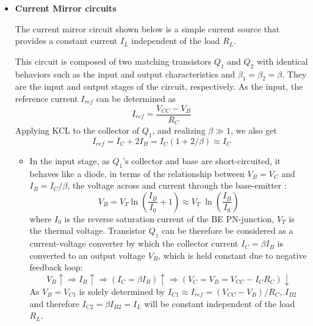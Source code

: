 \documentclass{article}
\begin{document}
\begin{itemize}


\item {\bf Current Mirror circuits}

  The current mirror circuit shown below is a simple current source
  that provides a constant current $I_L$ independent of the load $R_L$. 


  This circuit is composed of two matching transistors $Q_1$ and $Q_2$
  with identical behaviors such as the input and output characteristics
  and $\beta_1=\beta_2=\beta$. They are the input and output stages of
  the circuit, respectively. As the input, the reference current $I_{ref}$
  can be determined as
  \begin{equation}
    I_{ref}=\frac{V_{CC}-V_B}{R_C}
  \end{equation}
  Applying KCL to the collector of $Q_1$, and realizing $\beta\gg 1$,
  we also get
  \begin{equation}
    I_{ref}=I_C+2I_B=I_C(1+2/\beta)\approx I_C
  \end{equation}
  \begin{itemize}
  \item In the input stage, as $Q_1$'s collector and base are short-circuited,
    it behaves like a diode, in terms of the relationship between $V_B=V_C$ 
    and $I_B=I_C/\beta$, the voltage across and current through the base-emitter 
    :
    \begin{equation}
      V_B=V_T\ln \left(\frac{I_B}{I_0}+1\right)
      \approx V_T\;\ln \left(\frac{I_B}{I_0}\right)
    \end{equation}
    where $I_0$ is the reverse saturation current of the BE PN-junction, $V_T$
    is the thermal voltage. Transistor $Q_1$ can be therefore be considered as
    a current-voltage converter by which the collector current $I_C=\beta I_B$
    is converted to an output voltage $V_B$, which is held constant due to 
    negative feedback loop:
    \begin{equation}
      V_B\uparrow \Longrightarrow I_B\uparrow \Longrightarrow 
      (I_C=\beta I_B) \uparrow \Longrightarrow (V_C=V_B=V_{CC}-I_C R_C)\downarrow
    \end{equation} 
    As $V_B=V_{C1}$ is solely determined by $I_{C1}\approx I_{ref}=(V_{CC}-V_B)/R_C$, 
    $I_{B2}$ and therefore $I_{C2}=\beta I_{B2}=I_L$ will be constant independent 
    of the load $R_L$.
    

\end{itemize}
\end{itemize}
\end{document}
